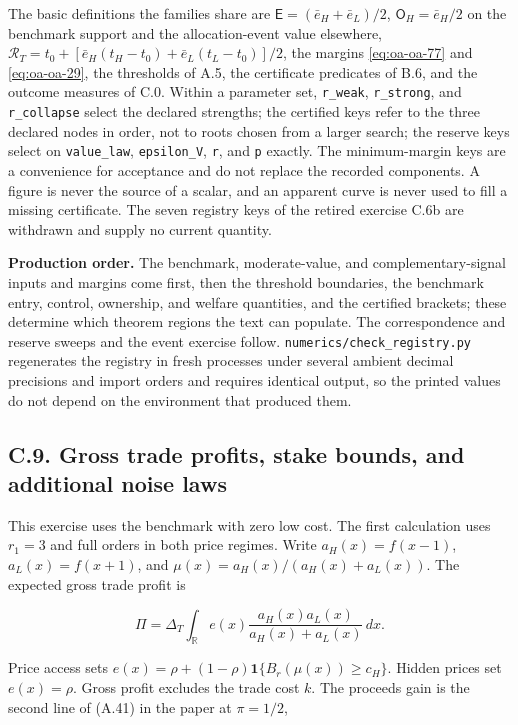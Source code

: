 \documentclass[
  11pt,
]{article}
\begin{document}
The basic definitions the families share are
\(\mathsf E=(\bar e_H+\bar e_L)/2\), \(\mathsf O_H=\bar e_H/2\) on the
benchmark support and the allocation-event value elsewhere,
\(\mathcal R_T=t_0+[\bar e_H(t_H-t_0)+\bar e_L(t_L-t_0)]/2\), the
margins \eqref{eq:oa-oa-77} and \eqref{eq:oa-oa-29}, the thresholds of
A.5, the certificate predicates of B.6, and the outcome measures of C.0.
Within a parameter set, \texttt{r\_weak}, \texttt{r\_strong}, and
\texttt{r\_collapse} select the declared strengths; the certified keys
refer to the three declared nodes in order, not to roots chosen from a
larger search; the reserve keys select on \texttt{value\_law},
\texttt{epsilon\_V}, \texttt{r}, and \texttt{p} exactly. The minimum-margin keys are a
convenience for acceptance and do not replace the recorded components. A
figure is never the source of a scalar, and an apparent curve is never
used to fill a missing certificate. The seven registry keys of the
retired exercise C.6b are withdrawn and supply no current quantity.

\textbf{Production order.} The benchmark, moderate-value, and
complementary-signal inputs and margins come first, then the threshold
boundaries, the benchmark entry, control, ownership, and welfare
quantities, and the certified brackets; these determine which theorem
regions the text can populate. The correspondence and reserve sweeps
and the event exercise follow.
\texttt{numerics/check\_registry.py} regenerates the registry in fresh
processes under several ambient decimal precisions and import orders and
requires identical output, so the printed values do not depend on the
environment that produced them.

\subsection{C.9. Gross trade profits, stake bounds, and additional noise
laws}\label{oa-c-revision}

This exercise uses the benchmark with zero low cost. The first
calculation uses \(r_1=3\) and full orders in both price regimes. Write
\(a_H(x)=f(x-1)\), \(a_L(x)=f(x+1)\), and
\(\mu(x)=a_H(x)/(a_H(x)+a_L(x))\). The expected gross trade profit is

\[
\Pi=\Delta_T\int_{\mathbb R}e(x)\frac{a_H(x)a_L(x)}{a_H(x)+a_L(x)}\,dx.
\]

Price access sets \(e(x)=\rho+(1-\rho)\mathbf1\{B_r(\mu(x))\ge c_H\}\).
Hidden prices set \(e(x)=\rho\). Gross profit excludes the trade cost
\(k\). The proceeds gain is the second line of (A.41) in the paper at
\(\pi=1/2\),
\end{document}
